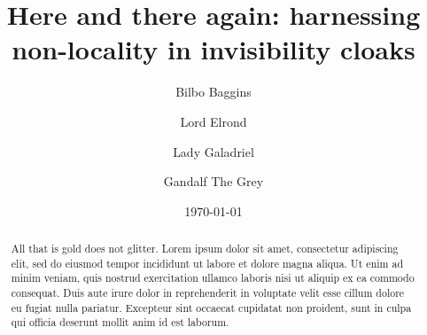 \documentclass[aip,graphicx]{revtex4-1}
\begin{document}
\title{Here and there again: harnessing non-locality in invisibility cloaks}\author{Bilbo Baggins}

\author{Lord Elrond}
 \author{Lady Galadriel}
 \author{Gandalf The Grey}
 
\date{\today}  

\begin{abstract}
All that is gold does not glitter. Lorem ipsum dolor sit amet,
consectetur adipiscing elit, sed do eiusmod tempor incididunt ut labore
et dolore magna aliqua. Ut enim ad minim veniam, quis nostrud
exercitation ullamco laboris nisi ut aliquip ex ea commodo consequat.
Duis aute irure dolor in reprehenderit in voluptate velit esse cillum
dolore eu fugiat nulla pariatur. Excepteur sint occaecat cupidatat non
proident, sunt in culpa qui officia deserunt mollit anim id est laborum.
\end{abstract}

\maketitle

\lipsum[2-6]
\end{document}
